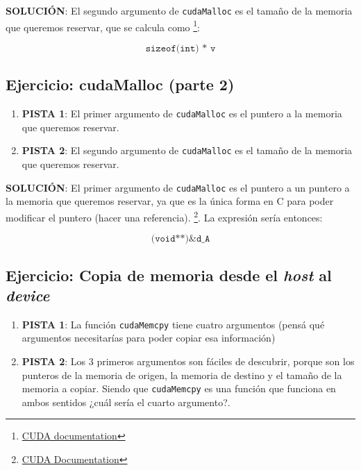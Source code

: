 \textbf{SOLUCIÓN}: El segundo argumento de \texttt{cudaMalloc} es el tamaño de la memoria que queremos reservar, que se
calcula como \footnote{\href{https://docs.nvidia.com/cuda/cuda-runtime-api/group__CUDART__MEMORY.html}{CUDA
documentation}}:

\begin{equation}
  \texttt{sizeof(int) * v}
\end{equation}

\subsection{Ejercicio: cudaMalloc (parte 2)}

\begin{enumerate}
  \item \textbf{PISTA 1}: El primer argumento de \texttt{cudaMalloc} es el puntero a la memoria que queremos reservar.

  \item \textbf{PISTA 2}: El segundo argumento de \texttt{cudaMalloc} es el tamaño de la memoria que queremos reservar.
\end{enumerate}

\textbf{SOLUCIÓN}: El primer argumento de \texttt{cudaMalloc} es el puntero a un puntero a la memoria que queremos
reservar, ya que es la única forma en C para poder modificar el puntero (hacer una referencia).
\footnote{\href{https://docs.nvidia.com/cuda/cuda-runtime-api/group__CUDART__MEMORY.html}{CUDA Documentation}}. La
expresión sería entonces:

\begin{equation}
  \texttt{(void**)\&d\_A}
\end{equation}

\subsection{Ejercicio: Copia de memoria desde el \textit{host} al \textit{device}}

\begin{enumerate}
  \item \textbf{PISTA 1}: La función \texttt{cudaMemcpy} tiene cuatro argumentos (pensá qué argumentos necesitarías para
    poder copiar esa información)

  \item \textbf{PISTA 2}: Los 3 primeros argumentos son fáciles de descubrir, porque son los punteros de la memoria de
    origen, la memoria de destino y el tamaño de la memoria a copiar. Siendo que \texttt{cudaMemcpy} es una función que
    funciona en ambos sentidos ¿cuál sería el cuarto argumento?.
\end{enumerate}

